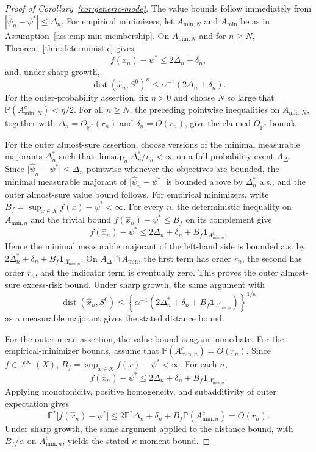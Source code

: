 \documentclass[11pt]{article}
\begin{document}
\begin{proof}[Proof of Corollary~\ref{cor:generic-mode}]
The value bounds follow immediately from
$|\hat{\psi}_{n}-\psi^{*}|\le\Delta_{n}$. For empirical minimizers, let
$A_{\mathrm{min},N}$ and $A_{\mathrm{min}}$ be as in
Assumption~\ref{ass:emp-min-membership}. On $A_{\mathrm{min},N}$ and for
$n\ge N$, Theorem~\ref{thm:deterministic} gives
\[
f(\hat{x}_{n})-\psi^{*}\le2\Delta_{n}+\delta_{n},
\]
and, under sharp growth,
\[
\operatorname{dist}(\hat{x}_{n},S^{0})^{\kappa}
\le\alpha^{-1}(2\Delta_{n}+\delta_{n}).
\]
For the outer-probability assertion, fix $\eta>0$ and choose $N$ so large that
$\mathbb{P}(A_{\mathrm{min},N}^{c})<\eta/2$. For all $n\ge N$, the preceding
pointwise inequalities on $A_{\mathrm{min},N}$, together with
$\Delta_{n}=O_{\mathbb{P}^{*}}(r_{n})$ and $\delta_{n}=O(r_{n})$, give the
claimed $O_{\mathbb{P}^{*}}$ bounds.

For the outer almost-sure assertion, choose versions of the minimal measurable
majorants $\Delta_{n}^{*}$ such that $\limsup_{n}\Delta_{n}^{*}/r_{n}<\infty$
on a full-probability event $A_{\Delta}$. Since
$\lvert\hat{\psi}_{n}-\psi^{*}\rvert\le\Delta_{n}$ pointwise whenever the
objectives are bounded, the minimal measurable majorant of
$\lvert\hat{\psi}_{n}-\psi^{*}\rvert$ is bounded above by $\Delta_{n}^{*}$
a.s., and the outer almost-sure value bound follows. For empirical minimizers,
write $B_{f}=\sup_{x\in X}f(x)-\psi^{*}<\infty$. For every $n$, the deterministic
inequality on $A_{\mathrm{min},n}$ and the trivial bound
$f(\hat{x}_{n})-\psi^{*}\le B_{f}$ on its complement give
\[
f(\hat{x}_{n})-\psi^{*}\le2\Delta_{n}+\delta_{n}+B_{f}\mathbf{1}_{A_{\mathrm{min},n}^{c}}.
\]
Hence the minimal measurable majorant of the left-hand side is bounded a.s. by
$2\Delta_{n}^{*}+\delta_{n}+B_{f}\mathbf{1}_{A_{\mathrm{min},n}^{c}}$. On
$A_{\Delta}\cap A_{\mathrm{min}}$, the first term has order $r_{n}$, the
second has order $r_{n}$, and the indicator term is eventually zero. This proves
the outer almost-sure excess-risk bound. Under sharp growth, the same argument
with
\[
\operatorname{dist}(\hat{x}_{n},S^{0})\le\left\{\alpha^{-1}\left(2\Delta_{n}^{*}+\delta_{n}+B_{f}\mathbf{1}_{A_{\mathrm{min},n}^{c}}\right)\right\}^{1/\kappa}
\]
as a measurable majorant gives the stated distance bound.

For the outer-mean assertion, the value bound is again immediate. For the
empirical-minimizer bounds, assume that
$\mathbb{P}(A_{\mathrm{min},n}^{c})=O(r_{n})$. Since $f\in\ell^{\infty}(X)$,
$B_{f}=\sup_{x\in X}f(x)-\psi^{*}<\infty$. For each $n$,
\[
f(\hat{x}_{n})-\psi^{*}
\le 2\Delta_{n}+\delta_{n}+B_{f}\mathbf{1}_{A_{\mathrm{min},n}^{c}}.
\]
Applying monotonicity, positive homogeneity, and subadditivity of outer
expectation gives
\[
\mathbb{E}^{*}\bigl[f(\hat{x}_{n})-\psi^{*}\bigr]
\le2\mathbb{E}^{*}\Delta_{n}+\delta_{n}+B_{f}\mathbb{P}(A_{\mathrm{min},n}^{c})=O(r_{n}).
\]
Under sharp growth, the same argument applied to the distance bound, with
$B_{f}/\alpha$ on $A_{\mathrm{min},n}^{c}$, yields the stated
$\kappa$-moment bound.
\end{proof}
\end{document}

